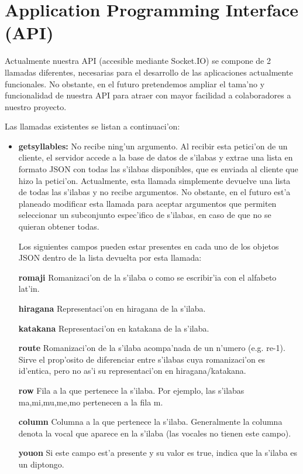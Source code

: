 \section{Application Programming Interface (API)}
\label{sub:application_programming_interface_(api)}

Actualmente nuestra API (accesible mediante Socket.IO) se compone de 2 llamadas diferentes, necesarias para el
desarrollo de las aplicaciones actualmente funcionales. No obstante, en el futuro pretendemos ampliar el tama'no y
funcionalidad de nuestra API para atraer con mayor facilidad a colaboradores a nuestro proyecto.

Las llamadas existentes se listan a continuaci'on:

\begin{itemize}
\item \textbf{getsyllables:} No recibe ning'un argumento. Al recibir esta petici'on de un cliente, el servidor accede
a la base de datos de s'ilabas y extrae una lista en formato JSON con todas las s'ilabas disponibles, que es enviada
al cliente que hizo la petici'on.
Actualmente, esta llamada simplemente devuelve una lista de todas las s'ilabas y no recibe argumentos. No obstante,
en el futuro est'a planeado modificar esta llamada para aceptar argumentos que permiten seleccionar un subconjunto
espec'ifico de s'ilabas, en caso de que no se quieran obtener todas.

Los siguientes campos pueden estar presentes en cada uno de los objetos JSON dentro de la lista devuelta por esta
llamada:

\textbf{romaji} Romanizaci'on de la s'ilaba o como se escribir'ia con el alfabeto lat'in.

\textbf{hiragana} Representaci'on en hiragana de la s'ilaba.

\textbf{katakana} Representaci'on en katakana de la s'ilaba.

\textbf{route} Romanizaci'on de la s'ilaba acompa'nada de un n'umero (e.g. re-1). Sirve el prop'osito de
diferenciar entre s'ilabas cuya romanizaci'on es id'entica, pero no as'i su representaci'on en hiragana/katakana.

\textbf{row} Fila a la que pertenece la s'ilaba. Por ejemplo, las s'ilabas ma,mi,mu,me,mo  pertenecen a la fila m.
 
\textbf{column} Columna a la que pertenece la s'ilaba. Generalmente la columna denota la vocal que aparece en la s'ilaba
(las vocales no tienen este campo).

\textbf{youon} Si este campo est'a presente y su valor es true, indica que la s'ilaba es un diptongo.


\end{itemize}
